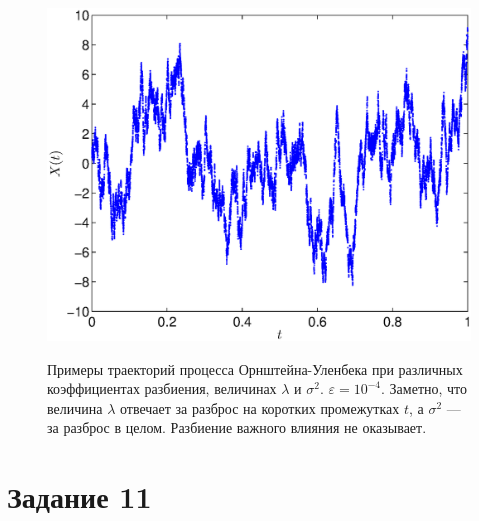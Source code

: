 \documentclass[12pt, a4paper]{article}
\begin{document}
\begin{figure}[H]
{\includegraphics[scale=0.45]{tagirbeck_eps0001_a05_s100_l3.eps}
}
\caption{Примеры траекторий процесса Орнштейна-Уленбека при различных коэффициентах разбиения, величинах $\lambda$ и $\sigma^2$. $\varepsilon = 10^{-4}$. Заметно, что величина $\lambda$ отвечает за разброс на коротких промежутках $t$, а $\sigma^2$ --- за разброс в целом. Разбиение важного влияния не оказывает.}
\end{figure}

\newpage
\section{Задание 11}
\end{document}

